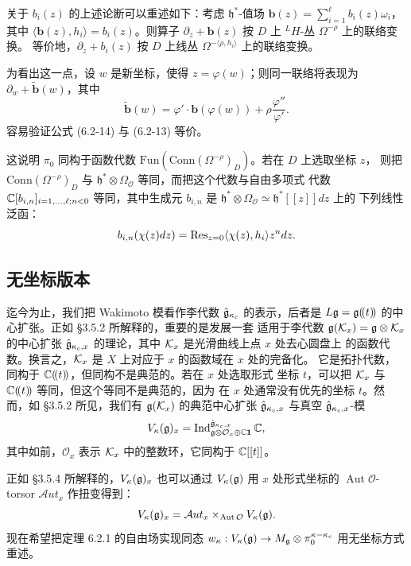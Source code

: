 关于 $b_i(z)$ 的上述论断可以重述如下：考虑 $\mathfrak h^*$-值场
$\mathbf b(z)=\sum_{i=1}^\ell b_i(z)\omega_i$，其中
$\langle\mathbf b(z),h_i\rangle=b_i(z)$。则算子
$\partial_z+\mathbf b(z)$ 按 $D$ 上 $^LH$-丛 $\Omega^{-\rho}$ 上的联络变换。
等价地，$\partial_z+b_i(z)$ 按 $D$ 上线丛
$\Omega^{-\langle\rho,h_i\rangle}$ 上的联络变换。

为看出这一点，设 $w$ 是新坐标，使得 $z=\varphi(w)$；则同一联络将表现为
$\partial_w+\widetilde{\mathbf b}(w)$，其中
\begin{equation}
    \widetilde{\mathbf b}(w)
    =\varphi'\cdot\mathbf b(\varphi(w))
    +\rho\frac{\varphi''}{\varphi'}.
    \tag{6.2-14}
\end{equation}
容易验证公式 (6.2-14) 与 (6.2-13) 等价。

这说明 $\pi_0$ 同构于函数代数
$\mathrm{Fun}(\mathrm{Conn}(\Omega^{-\rho})_D)$。若在 $D$ 上选取坐标 $z$，
则把 $\mathrm{Conn}(\Omega^{-\rho})_D$ 与
$\mathfrak h^*\otimes\Omega_{\mathcal O}$ 等同，而把这个代数与自由多项式
代数 $\mathbb{C}[b_{i,n}]_{i=1,\dots,\ell;n<0}$ 等同，其中生成元 $b_{i,n}$ 是
$\mathfrak h^*\otimes\Omega_{\mathcal O}\simeq\mathfrak h^*[[z]]dz$ 上的
下列线性泛函：
\[
    b_{i,n}(\chi(z)dz)=\operatorname{Res}_{z=0}\langle\chi(z),h_i\rangle z^n dz.
\]

\subsection{无坐标版本}

迄今为止，我们把 Wakimoto 模看作李代数 $\hat{\mathfrak{g}}_{\kappa_c}$ 的表示，后者是
$L\mathfrak{g}=\mathfrak{g}(\!(t)\!)$ 的中心扩张。正如 \S3.5.2 所解释的，重要的是发展一套
适用于李代数 $\mathfrak{g}(\mathcal{K}_x)=\mathfrak{g}\otimes\mathcal{K}_x$ 的中心扩张
$\hat{\mathfrak{g}}_{\kappa_c,x}$ 的理论，其中 $\mathcal{K}_x$ 是光滑曲线上点 $x$ 处去心圆盘上
的函数代数。换言之，$\mathcal{K}_x$ 是 $X$ 上对应于 $x$ 的函数域在 $x$ 处的完备化。
它是拓扑代数，同构于 $\mathbb{C}(\!(t)\!)$，但同构不是典范的。若在 $x$ 处选取形式
坐标 $t$，可以把 $\mathcal{K}_x$ 与 $\mathbb{C}(\!(t)\!)$ 等同，但这个等同不是典范的，因为
在 $x$ 处通常没有优先的坐标 $t$。然而，如 \S3.5.2 所见，我们有
$\mathfrak{g}(\mathcal{K}_x)$ 的典范中心扩张 $\hat{\mathfrak{g}}_{\kappa_c,x}$ 与真空
$\hat{\mathfrak{g}}_{\kappa_c,x}$-模
\[
    V_\kappa(\mathfrak{g})_x
    =\operatorname{Ind}_{\mathfrak{g}\otimes\mathcal O_x\oplus\mathbb{C}\mathbf 1}^{\hat{\mathfrak{g}}_{\kappa_c,x}}\mathbb{C},
\]
其中如前，$\mathcal O_x$ 表示 $\mathcal{K}_x$ 中的整数环，它同构于 $\mathbb{C}[[t]]$。

正如 \S3.5.4 所解释的，$V_\kappa(\mathfrak{g})_x$ 也可以通过 $V_\kappa(\mathfrak{g})$ 用
$x$ 处形式坐标的 $\operatorname{Aut}\mathcal O$-torsor
$\mathcal Aut_x$ 作扭变得到：
\[
    V_\kappa(\mathfrak{g})_x=\mathcal Aut_x\times_{\operatorname{Aut}\mathcal O}
    V_\kappa(\mathfrak{g}).
\]
现在希望把定理 6.2.1 的自由场实现同态
$w_\kappa:V_\kappa(\mathfrak{g})\to M_{\mathfrak g}\otimes\pi_0^{\kappa-\kappa_c}$
用无坐标方式重述。

